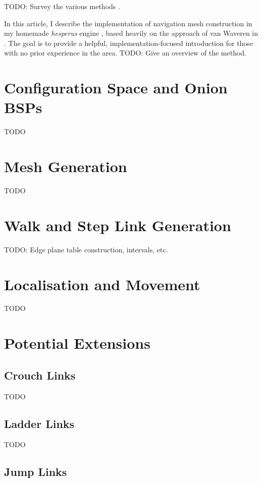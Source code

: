 \documentclass[10pt,onecolumn]{article}
\begin{document}
TODO: Survey the various methods \cite{axelrod08,farnstrom06,hale11,hamm08,kallmann10,mcanlis08,oliva11,pettre05,ratcliff08,tozour02,vantoll11,vanwaveren01,wein05}.

In this article, I describe the implementation of navigation mesh construction in my homemade \emph{hesperus} engine \cite{hesperus}, based heavily on the approach of van Waveren in \cite{vanwaveren01}. The goal is to provide a helpful, implementation-focused introduction for those with no prior experience in the area. TODO: Give an overview of the method.

\section*{Configuration Space and Onion BSPs}

TODO

\section*{Mesh Generation}

TODO

\section*{Walk and Step Link Generation}

TODO: Edge plane table construction, intervals, etc.

\section*{Localisation and Movement}

TODO

\section*{Potential Extensions}

\subsection*{Crouch Links}

TODO

\subsection*{Ladder Links}

TODO

\subsection*{Jump Links}
\end{document}
